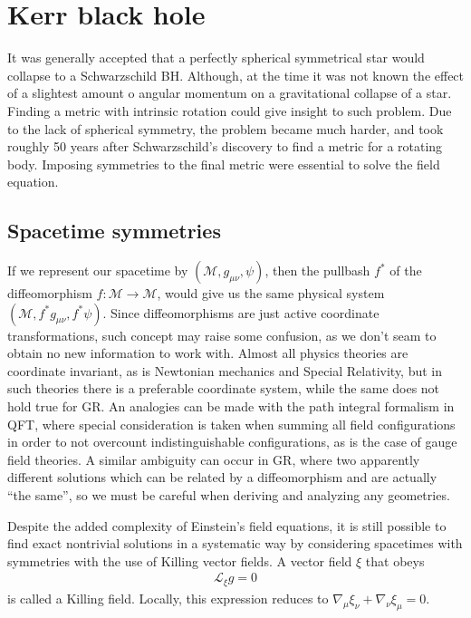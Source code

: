 \section{Kerr black hole}

It was generally accepted that a perfectly spherical symmetrical star would collapse to a Schwarzschild BH. 
Although, at the time it was not known the effect of a slightest amount o angular momentum on a gravitational collapse of a star.
Finding a metric with intrinsic rotation could give insight to such problem. Due to the lack of spherical symmetry, the problem became much harder, and took roughly 50 years after Schwarzschild's discovery to find a metric for a rotating body.
Imposing symmetries to the final metric were essential to solve the field equation.

\subsection{Spacetime symmetries}

If we represent our spacetime by $(\mathcal{M}, g_{\mu\nu}, \psi)$, then the pullbash $f^*$ of the diffeomorphism $f:\mathcal{M}\rightarrow\mathcal{M}$, would give us the same physical system $(\mathcal{M}, f^* g_{\mu\nu}, f^* \psi)$.
Since diffeomorphisms are just active coordinate transformations, such concept may raise some confusion, as we don't seam to obtain no new information to work with. 
Almost all physics theories are coordinate invariant, as is Newtonian mechanics and Special Relativity, but in such theories there is a preferable coordinate system, while the same does not hold true for GR.
An analogies can be made with the path integral formalism in QFT, where special consideration is taken when summing all field configurations in order to not overcount indistinguishable configurations, as is the case of gauge field theories.
A similar ambiguity can occur in GR, where two apparently different solutions which can be related by a diffeomorphism and are actually ``the same'', so we must be careful when deriving and analyzing any geometries.

Despite the added complexity of Einstein's field equations, it is still possible to find exact nontrivial solutions in a systematic way by considering spacetimes with symmetries with the use of Killing vector fields.
A vector field $\xi$ that obeys
\begin{align}
    \mathcal{L}_\xi  g = 0  
    \label{eq2:killing}
\end{align}
is called a Killing field. Locally, this expression reduces to $\nabla_\mu \xi_\nu + \nabla_\nu \xi_\mu = 0$.

